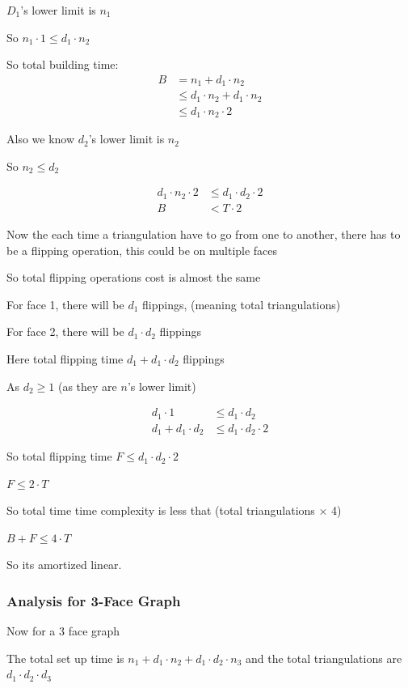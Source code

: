 \documentclass[12pt,a4paper]{article}
\begin{document}
$D_1$'s lower limit is $n_1$

So $n_1 \cdot 1 \leq d_1 \cdot n_2$

So total building time:
\begin{align*}
B &= n_1 + d_1 \cdot n_2 \\
&\leq d_1 \cdot n_2 + d_1 \cdot n_2 \\
&\leq d_1 \cdot n_2 \cdot 2
\end{align*}

Also we know $d_2$'s lower limit is $n_2$

So $n_2 \leq d_2$

\begin{align*}
d_1 \cdot n_2 \cdot 2 &\leq d_1 \cdot d_2 \cdot 2 \\
B &< T \cdot 2
\end{align*}

Now the each time a triangulation have to go from one to another, there has to be a flipping operation, this could be on multiple faces

So total flipping operations cost is almost the same

For face 1, there will be $d_1$ flippings, (meaning total triangulations)

For face 2, there will be $d_1 \cdot d_2$ flippings 

Here total flipping time $d_1 + d_1 \cdot d_2$ flippings

As $d_2 \geq 1$ (as they are $n$'s lower limit)

\begin{align*}
d_1 \cdot 1 &\leq d_1 \cdot d_2 \\
d_1 + d_1 \cdot d_2 &\leq d_1 \cdot d_2 \cdot 2
\end{align*}

So total flipping time $F \leq d_1 \cdot d_2 \cdot 2$

$F \leq 2 \cdot T$

So total time time complexity is less that (total triangulations $\times$ 4)

$B + F \leq 4 \cdot T$

So its amortized linear.

\subsubsection{Analysis for 3-Face Graph}

Now for a 3 face graph

The total set up time is $n_1 + d_1 \cdot n_2 + d_1 \cdot d_2 \cdot n_3$ and the total triangulations are $d_1 \cdot d_2 \cdot d_3$
\end{document}
